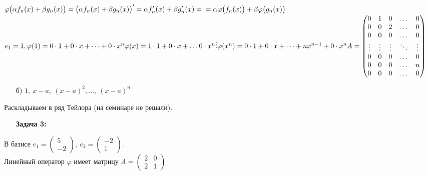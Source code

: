 \documentclass[12pt, letterpaper, twoside]{article}
\begin{document}
        $\varphi\big(\alpha f_n(x) + \beta g_n(x)\big) = \big(\alpha f_n(x) + \beta g_n (x)\big)' = \alpha f'_n(x) + \beta g'_n(x) =\\
        =\alpha \varphi\big(f_n(x)\big) + \beta \varphi\big(g_n(x)\big)$\\
        $e_1 = 1,\\
        \varphi(1) = 0\cdot 1 + 0\cdot x + \dots + 0\cdot x^n\\
        \varphi(x) = 1\cdot 1 + 0\cdot x + \dots 0\cdot x^n\\
        \vdots\\
        \varphi(x^n) = 0\cdot 1 + 0\cdot x + \dots + nx^{n - 1} + 0\cdot x^n\\
        A = \begin{pmatrix}
            0 & 1 & 0 & \dots & 0\\
            0 & 0 & 2 & \dots & 0\\
            0 & 0 & 0 & \dots & 0\\
            \vdots & \vdots & \vdots & \ddots & \vdots\\
            0 & 0 & 0 & \dots & 0\\
            0 & 0 & 0 & \dots & n\\
            0 & 0 & 0 & \dots & 0
        \end{pmatrix}$
        \begin{enumerate}
            \item[б)] $1,\ x - a,\ (x - a)^2,\dots,\ (x - a)^n$
        \end{enumerate}
        Раскладываем в ряд Тейлора (на семинаре не решали).\newpage
        \begin{enumerate}
            \item[\textbf{Задача 3:}]
        \end{enumerate}
        В базисе $e_1 = \begin{pmatrix}
            5\\
            -2
        \end{pmatrix},\ e_2 = \begin{pmatrix}
            -2\\
            1
        \end{pmatrix}$.\\
        Линейный оператор $\varphi$ имеет матрицу $A = \begin{pmatrix}
            2 & 0\\
            2 & 1
        \end{pmatrix}$\\
\end{document}
